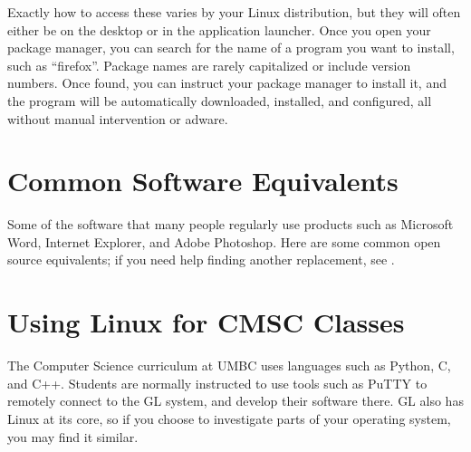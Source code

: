 \documentclass[11pt,notumble]{leaflet}
\begin{document}
Exactly how to access these varies by your Linux distribution, but they will
often either be on the desktop or in the application launcher. Once you open
your package manager, you can search for the name of a program you want to
install, such as ``firefox''. Package names are rarely capitalized or include
version numbers. Once found, you can instruct your package manager to install
it, and the program will be automatically downloaded, installed, and configured,
all without manual intervention or adware.


\section{Common Software Equivalents}
\label{section:common-software-equivalents}

Some of the software that many people regularly use products such as Microsoft
Word, Internet Explorer, and Adobe Photoshop.  Here are some common open source
equivalents; if you need help finding another replacement, see
.



\section{Using Linux for CMSC Classes}
\label{section:linux-for-cmsc}

The Computer Science curriculum at UMBC uses languages such as Python, C, and
C++. Students are normally instructed to use tools such as PuTTY to remotely
connect to the GL system, and develop their software there. GL also has Linux at
its core, so if you choose to investigate parts of your operating system, you
may find it similar.
\end{document}
